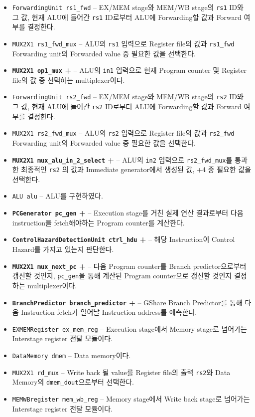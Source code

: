 \documentclass{scrartcl}
\begin{document}
\begin{itemize}
  \item \texttt{ForwardingUnit rs1\_fwd} -- EX/MEM stage와 MEM/WB stage의 \texttt{rs1} ID와 그 값, 현재 ALU에 들어간 \texttt{rs1} ID로부터 ALU에 Forwarding할 값과 Forward 여부를 결정한다.
  \item \texttt{MUX2X1 rs1\_fwd\_mux} -- ALU의 \texttt{rs1} 입력으로 Register file의 값과 \texttt{rs1\_fwd} Forwarding unit의 Forwarded value 중 필요한 값을 선택한다.
  \item \textbf{\texttt{MUX2X1 op1\_mux} +} -- ALU의 \texttt{in1} 입력으로 현재 Program counter 및 Register file의 값 중 선택하는 multiplexer이다.
  \item \texttt{ForwardingUnit rs2\_fwd} -- EX/MEM stage와 MEM/WB stage의 \texttt{rs2} ID와 그 값, 현재 ALU에 들어간 \texttt{rs2} ID로부터 ALU에 Forwarding할 값과 Forward 여부를 결정한다.
  \item \texttt{MUX2X1 rs2\_fwd\_mux} -- ALU의 \texttt{rs2} 입력으로 Register file의 값과 \texttt{rs2\_fwd} Forwarding unit의 Forwarded value 중 필요한 값을 선택한다.
  \item \textbf{\texttt{MUX2X1 mux\_alu\_in\_2\_select} +} -- ALU의 \texttt{in2} 입력으로 \texttt{rs2\_fwd\_mux}를 통과한 최종적인 \texttt{rs2} 의 값과 Immediate generator에서 생성된 값, +4 중 필요한 값을 선택한다.
  \item \texttt{ALU alu} -- ALU를 구현하였다.
  \item \textbf{\texttt{PCGenerator pc\_gen} +} -- Execution stage를 거친 실제 연산 결과로부터 다음 instruction을 fetch해야하는 Program counter를 계산한다.
  \item \textbf{\texttt{ControlHazardDetectionUnit ctrl\_hdu} +} -- 해당 Instruction이 Control Hazard를 가지고 있는지 판단한다.
  \item \textbf{\texttt{MUX2X1 mux\_next\_pc} +} -- 다음 Program counter를 Branch predictor으로부터 갱신할 것인지, \texttt{pc\_gen}을 통해 계산된 Program counter으로 갱신할 것인지 결정하는 multiplexer이다.
  \item \textbf{\texttt{BranchPredictor branch\_predictor} +} -- GShare Branch Predictor를 통해 다음 Instruction fetch가 일어날 Instruction address를 예측한다.
  \item \texttt{EXMEMRegister ex\_mem\_reg} -- Execution stage에서 Memory stage로 넘어가는 Interstage register 전달 모듈이다.
  \item \texttt{DataMemory dmem} -- Data memory이다.
  \item \texttt{MUX2X1 rd\_mux} -- Write back 될 value를 Register file의 출력 \texttt{rs2}와 Data Memory의 \texttt{dmem\_dout}으로부터 선택한다.
  \item \texttt{MEMWBregister mem\_wb\_reg} -- Memory stage에서 Write back stage로 넘어가는 Interstage register 전달 모듈이다.
\end{itemize}
\end{document}
